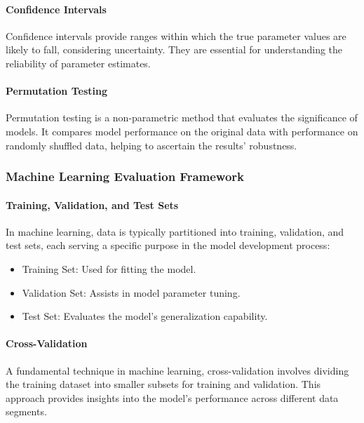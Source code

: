 \paragraph{Confidence Intervals}

Confidence intervals provide ranges within which the true parameter values are likely to fall, considering uncertainty.
They are essential for understanding the reliability of parameter estimates.

\paragraph{Permutation Testing}

Permutation testing is a non-parametric method that evaluates the significance of models. It compares model performance on the original data with performance on randomly shuffled data, helping to ascertain the results' robustness.

\subsubsection{Machine Learning Evaluation Framework}

\paragraph{Training, Validation, and Test Sets}

In machine learning, data is typically partitioned into training, validation, and test sets, each serving a specific purpose in the model development process:

\begin{itemize}
    \item Training Set: Used for fitting the model.
    \item Validation Set: Assists in model parameter tuning.
    \item Test Set: Evaluates the model's generalization capability.
\end{itemize}

\paragraph{Cross-Validation}

A fundamental technique in machine learning, cross-validation involves dividing the training dataset into smaller subsets for training and validation.
This approach provides insights into the model's performance across different data segments.

